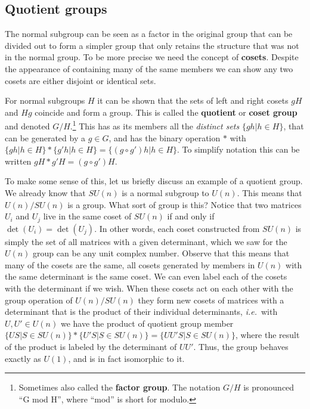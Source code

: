 \documentclass[notes.tex]{subfiles}
\begin{document}
\subsection{Quotient groups}
The normal subgroup can be seen as a factor in the original group that can be divided out to form a simpler group that only retains the structure that was not in the normal group. To be more precise we need the concept of {\bf cosets}. 
Despite the appearance of containing many of the same members we can show any two cosets are either disjoint or identical sets.

For normal subgroups $H$ it can be shown that the sets of left and right cosets $gH$ and $Hg$ coincide and form a group. This is called the {\bf quotient}  or {\bf coset group} and denoted $G/H$.\footnote{Sometimes also called the {\bf factor group}. The notation $G/H$ is pronounced ``G mod H'', where ``mod'' is short for modulo.}
This has as its members all the {\it distinct sets} $\{gh|h\in H\}$, that can be generated by a $g\in G$, and has the binary operation $*$ with $\{gh|h\in H\}*\{g'h|h\in H\}=\{ (g\circ g')h| h\in H\}$. To simplify notation this can be written $gH*g'H=(g\circ g') H$. 
 
To make some sense of this, let us briefly discuss an example of a quotient group. We already know that $SU(n)$ is a normal subgroup to $U(n)$. This means that $U(n)/SU(n)$ is a group. What sort of group is this? Notice that two matrices $U_i$ and $U_j$ live in the same coset of $SU(n)$ if and only if $\det(U_i)=\det(U_j)$. In other words, each coset constructed from $SU(n)$ is simply the set of all matrices with a given determinant, which we saw for the $U(n)$ group can be any unit complex number. Observe that this means that many of the cosets are the same, all cosets generated by members in $U(n)$ with the same determinant is the same coset. We can even label each of the cosets with the determinant if we wish.
When these cosets act on each other with the group operation of $U(n)/SU(n)$ they form new cosets of matrices with a determinant that is the product of their individual determinants, {\it i.e.}\ with $U,U'\in U(n)$ we have the product of quotient group member $\{US|S\in SU(n)\}*\{U'S| S\in SU(n)\}=\{ UU'S| S\in SU(n)\}$, where the result of the product is labeled by the determinant of $UU'$. Thus, the group behaves exactly as $U(1)$, and is in fact isomorphic to it.
\end{document}
